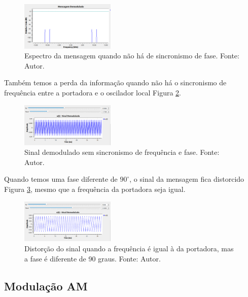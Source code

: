 \begin{figure}[!htpb]
    \centering
    \includegraphics[width=0.4\textwidth]{images/falta_sincronismo_dsb.png}
    \caption{Espectro da mensagem quando não há de sincronismo de fase. Fonte: Autor.}
    \label{fig:falta_sincronismo_dsb}
\end{figure}

Também temos a perda da informação quando não há o sincronismo de frequência entre a portadora e o oscilador local Figura \ref{fig:sinal_sem_sincronismo_dsb}.

\begin{figure}[!htpb]
    \centering
    \includegraphics[width=0.4\textwidth]{images/sinal_sem_sincronismo_dsb.png}
    \caption{Sinal demodulado sem sincronismo de frequência e fase. Fonte: Autor.}
    \label{fig:sinal_sem_sincronismo_dsb}
\end{figure}

Quando temos uma fase diferente de $90^\circ$, o sinal da mensagem fica distorcido Figura \ref{fig:distorcao_dsb}, mesmo que a frequência da portadora seja igual.

\begin{figure}[!htpb]
    \centering
    \includegraphics[width=0.4\textwidth]{images/distorcao_dsb.png}
    \caption{Distorção do sinal quando a frequência é igual à da portadora, mas a fase é diferente de 90 graus. Fonte: Autor.}
    \label{fig:distorcao_dsb}
\end{figure}

\subsection{Modulação AM}


